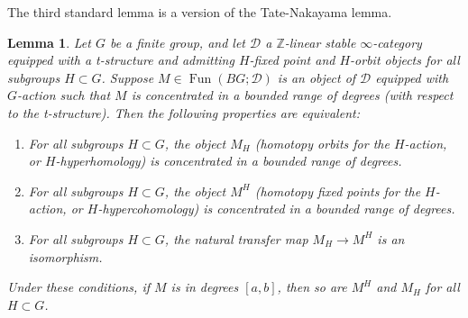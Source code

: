 \documentclass[12pt]{article}
\newtheorem{lemma}[theorem]{Lemma}
\theoremstyle{definition}
\newcommand{\on}{\operatorname}
\newcommand{\mc}{\mathcal}
\newcommand{\mbb}{\mathbb}
\begin{document}
The third standard lemma is a version of the Tate-Nakayama lemma.

\begin{lemma}\label{uniformbound}
Let $G$ be a finite group, and let $\mc{D}$ a $\mbb{Z}$-linear stable $\infty$-category equipped with a t-structure and admitting $H$-fixed point and $H$-orbit objects for all subgroups $H\subset G$.  Suppose $M\in\on{Fun}(BG;\mc{D})$ is an object of $\mc{D}$ equipped with $G$-action such that $M$ is concentrated in a bounded range of degrees (with respect to the t-structure).  Then the following properties are equivalent:
\begin{enumerate}
\item For all subgroups $H\subset G$, the object $M_H$ (homotopy orbits for the $H$-action, or $H$-hyperhomology) is concentrated in a bounded range of degrees.
\item For all subgroups $H\subset G$, the object $M^H$ (homotopy fixed points for the $H$-action, or $H$-hypercohomology) is concentrated in a bounded range of degrees.
\item For all subgroups $H\subset G$, the natural transfer map $M_H \to M^H$ is an isomorphism.
\end{enumerate}
Under these conditions, if $M$ is in degrees $[a,b]$, then so are $M^H$ and $M_H$ for all $H\subset G$.
\end{lemma}
\end{document}
